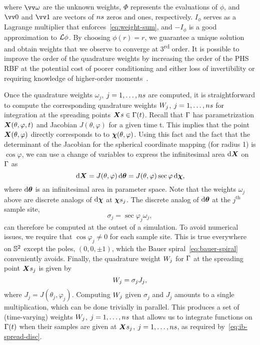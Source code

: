 where $\arr{\omega}$ are the unknown weights, $\Phi$ represents the evaluations of $\phi$, and $\arr{0}$ and
$\arr{1}$ are vectors of $\sample\cardinality$ zeros and ones, respectively. $I_{\phi}$ serves as a Lagrange
multiplier that enforces~\eqref{eq:weight-sum}, and $-I_\phi$ is a good approximation to $\mathcal{L}\phi$. By choosing
$\phi(r) = r$, we guarantee a unique solution and obtain weights that we observe to converge at
3\textsuperscript{rd} order. It is possible to improve the order of the quadrature weights by increasing the order
of the PHS RBF at the potential cost of poorer conditioning and either loss of invertibility or requiring
knowledge of higher-order moments~\cite{Fuselier:2013coba}.

Once the quadrature weights $\omega_j$, $j=1,\ldots,\sample\cardinality$ are computed, it is straightforward to
compute the corresponding quadrature weights $\weight[j]$, $j=1,\ldots,\sample\cardinality$ for integration at the
spreading points $\sample\X \in \interface(t)$. Recall that $\Gamma$ has parametrization
$\boldsymbol{X}(\theta, \varphi, t)$ and Jacobian $J(\theta, \varphi)$ for a given time t. This implies that the point
$\boldsymbol{X}(\theta, \varphi)$ directly corresponds to to $\boldsymbol{\chi}(\theta, \varphi)$. Using this fact and the fact that the
determinant of the Jacobian for the spherical coordinate mapping (for radius 1) is $\cos\varphi$, we can use a
change of variables to express the infinitesimal area $\d\X$ on $\Gamma$ as
\begin{equation}\label{eq:quad-cov}
    \d\X
    = J(\theta, \varphi)\d\qs
    = J(\theta, \varphi)\sec\varphi\d\Xp,
\end{equation}
where $\d\qs$ is an infinitesimal area in parameter space. Note that the weights $\omega_j$ above are discrete
analogs of $\d\Xp$ at $\Xpsj$. The discrete analog of $\d\qs$ at the $j^\text{th}$ sample site,
\begin{equation*}
    \sigma_j=\sec\varphi_j\omega_j,
\end{equation*}
can therefore be computed at the outset of a simulation. To avoid numerical issues, we require that
$\cos\varphi_j \neq 0$ for each sample site. This is true everywhere on $\mathbb{S}^2$ except the poles,
$(0, 0, \pm1)$, which the Bauer spiral~\eqref{eq:bauer-spiral} conveniently avoids. Finally, the quadrature weight
$\weight[j]$ for $\Gamma$ at the spreading point $\Xsj$ is given by
\begin{equation}
    \weight[j] = \sigma_j J_j,
\end{equation}
where $J_j = J(\theta_j, \varphi_j)$. Computing $\weight[j]$ given $\sigma_j$ and $J_j$ amounts to a single
multiplication, which can be done trivially in parallel. This produces a set of (time-varying) weights
$\weight[j]$, $j=1,\ldots,\sample\cardinality$ that allows us to integrate functions on $\Gamma(t)$ when their
samples are given at $\Xsj$, $j=1,\ldots,\sample\cardinality$, as required by~\eqref{eq:ib-spread-disc}.
